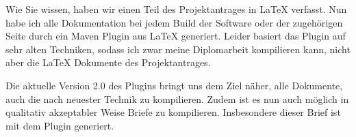 \documentclass[english,german,a4paper,fontsize=10pt,version=last]{scrlttr2}
\begin{document}
\newcommand{\AdressatFirma}{CapMini GmbH}
\newcommand{\AdressatTitel}{}
\newcommand{\AdressatVorname}{Egon}
\newcommand{\AdressatNachname}{Walther}
\newcommand{\AdressatAnschriftStrasse}{Walthershofener Straße 20}
\newcommand{\AdressatAnschriftPLZOrt}{88444 Walthershofen}

\begin{letter}{\Anschrift} 
  \opening{\Anrede}

  Wie Sie wissen, haben wir einen Teil des Projektantrages in \LaTeX{} verfasst. 
  Nun habe ich alle Dokumentation bei jedem \foreignlanguage{english}{Build} 
  der Software oder der zugehörigen Seite 
  durch ein \foreignlanguage{english}{Maven Plugin} aus \LaTeX{} generiert. 
  Leider basiert das \foreignlanguage{english}{Plugin} auf sehr alten Techniken, 
  sodass ich zwar meine Diplomarbeit kompilieren kann, 
  nicht aber die \LaTeX{} Dokumente des Projektantrages. 

  Die aktuelle Version 2.0 des Plugins bringt uns dem Ziel näher, 
  alle Dokumente, auch die nach neuester Technik zu kompilieren. 
  Zudem ist es nun auch möglich in qualitativ akzeptabler Weise 
  Briefe zu kompilieren. 
  Insbesondere dieser Brief ist mit dem Plugin generiert. 

  


  \closing{\Grussworte\\[2\baselineskip]}

\end{letter}
\end{document}

